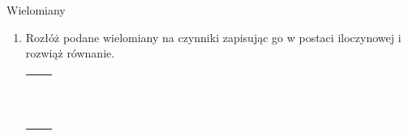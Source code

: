 \documentclass[12pt,a4paper]{article}
\begin{document}
	\begin{center}
		\LARGE Wielomiany
	\end{center}
	\vspace{1cm}
	
	
	\begin{enumerate}[1.]
		\item Rozłóż podane wielomiany na czynniki zapisując go w postaci iloczynowej i rozwiąż równanie.
		
		\begin{enumerate}[1)] \begin{tabular}{p{7cm} p{7cm}} 
				\item $-4x^2-2x^4+6x^3=0$		& \vspace{0.4cm} \item $9x^2-16=0$ \\
				\item $6x^3-12x^2+18x=0$		& \item $9x^2-30x+25=0$ \\
				\item $x^4-10x^2+25=0$			& \item $7x^3+2x^2-21x-6=0$ \\
				\item $ x^3+4x^2-2x-8=0$		& \item $2x^5+3x^4-2x-3=0$ \\
				\item $x^6-7x^3-8=0$			& \item $8x^5-32x^3-x^2+4=0$ \\
				\item $19x^3+9x^2-18x-9=0$		& \item $x^3+4x^2+x-6=0$ \\
				\item $x^3+7x^2+4x-12=0$		& \item $x^3-x+6=0$ \\
				\item $x^4+3x^3-15x^2-19x+30=0$	& \item $4x^4-12x^3+25x^2-48x+36=0$ \\
				\item $x^3+4x^2-2x-8=0$			& \item $x^3-9x^2+23x-15=0$ \\
				\item $x^3+12x^2+44x+48=0$		& \item $x^3+9x^2+23x+15=0$ \\
				\item $x^7-17x^6+16x^5=0$		& \item $x^8+x^4-2=0$ \\

\end{tabular}
\end{enumerate}
\end{enumerate}
\end{document}
